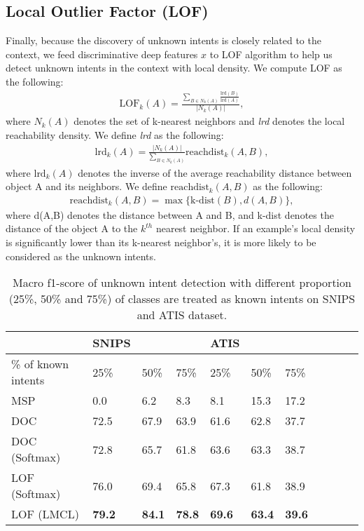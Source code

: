 \documentclass[11pt,a4paper]{article}
\begin{document}
\subsection{Local Outlier Factor (LOF)}
Finally, because the discovery of unknown intents is closely related to the context, we feed discriminative deep features $x$ to LOF algorithm \cite{breunig2000lof} to help us detect unknown intents in the context with local density. We compute LOF as the following:
\begin{align}
    \text{LOF}_k(A) = \frac{\sum_{B \in N_k(A)} \frac{\text{lrd}(B)}{\text{lrd}(A)}}{|N_k(A)|},
\end{align}
where $N_k(A)$ denotes the set of k-nearest neighbors and \emph{lrd} denotes the local reachability density. We define \emph{lrd} as the following:
\begin{align}
    \text{lrd}_k(A) = \frac{|N_{k}(A)|}{\sum_{B\in N_k(A)}} \text{reachdist}_k(A,B),
\end{align}
where $\text{lrd}_k(A)$ denotes the inverse of the average reachability distance between object A and its neighbors. We define $\text{reachdist}_k(A,B)$ as the following:
\begin{align}
    \text{reachdist}_k(A,B) = \max\{{\text{k-dist}(B), d(A,B)}\},
\end{align}
where d(A,B) denotes the distance between A and B, and k-dist denotes the distance of the object A to the $k^{th}$ nearest neighbor. If an example's local density is significantly lower than its k-nearest neighbor's, it is more likely to be considered as the unknown intents. 
\begin{table*}[t!]
\centering
\begin{tabular}{lllllllllll}
   & SNIPS &   &  & ATIS &   &  & \\
\toprule
\% of known intents & 25\% & 50\% & 75\%  & 25\% & 50\% & 75\%  \\
  \hline
MSP & 0.0 & 6.2 & 8.3 & 8.1 & 15.3 & 17.2 \\
DOC & 72.5 & 67.9 & 63.9 & 61.6 & 62.8 & 37.7 \\
DOC (Softmax) & 72.8 & 65.7 & 61.8 & 63.6 & 63.3 & 38.7 \\
LOF (Softmax) & 76.0 & 69.4 & 65.8 & 67.3 & 61.8 & 38.9 \\
LOF (LMCL) & \textbf{79.2} & \textbf{84.1} & \textbf{78.8} & \textbf{69.6} & \textbf{63.4} & \textbf{39.6} \\
\bottomrule
\end{tabular}
\caption{ \label{result-table}  Macro f1-score of unknown intent detection with different proportion (25\%, 50\% and 75\%) of classes are treated as known intents on SNIPS and ATIS dataset.}
\end{table*}
\end{document}
